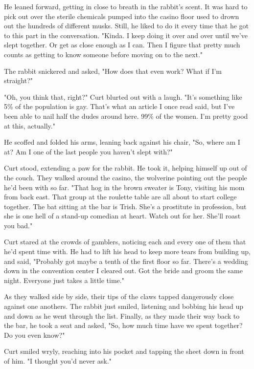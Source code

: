 He leaned forward, getting in close to breath in the rabbit's scent. It was hard to pick out over the sterile chemicals pumped into the casino floor used to drown out the hundreds of different musks. Still, he liked to do it every time that he got to this part in the conversation. "Kinda. I keep doing it over and over until we've slept together. Or get as close enough as I can. Then I figure that pretty much counts as getting to know someone before moving on to the next."

The rabbit snickered and asked, "How does that even work? What if I'm straight?"

"Oh, you think that, right?" Curt blurted out with a laugh. "It's something like 5\% of the population is gay. That's what an article I once read said, but I've been able to nail half the dudes around here. 99\% of the women. I'm pretty good at this, actually."

He scoffed and folded his arms, leaning back against his chair, "So, where am I at? Am I one of the last people you haven't slept with?"

Curt stood, extending a paw for the rabbit. He took it, helping himself up out of the couch. They walked around the casino, the wolverine pointing out the people he'd been with so far. "That hog in the brown sweater is Tony, visiting his mom from back east. That group at the roulette table are all about to start college together. The bat sitting at the bar is Trish. She's a prostitute in profession, but she is one hell of a stand-up comedian at heart. Watch out for her. She'll roast you bad."

Curt stared at the crowds of gamblers, noticing each and every one of them that he'd spent time with. He had to lift his head to keep more tears from building up, and said, "Probably got maybe a tenth of the first floor so far. There's a wedding down in the convention center I cleared out. Got the bride and groom the same night. Everyone just takes a little time."

As they walked side by side, their tips of the claws tapped dangerously close against one anothers. The rabbit just smiled, listening and bobbing his head up and down as he went through the list. Finally, as they made their way back to the bar, he took a seat and asked, "So, how much time have we spent together? Do you even know?"

Curt smiled wryly, reaching into his pocket and tapping the sheet down in front of him. "I thought you'd never ask."

